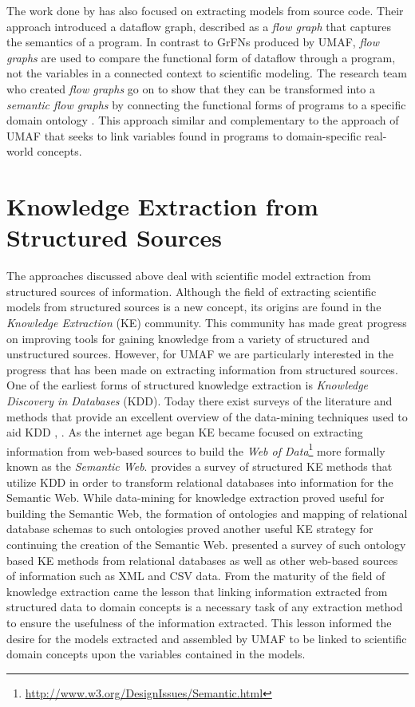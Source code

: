 The work done by \citet{Patterson2017DataflowRO} has also focused on extracting models from source code.
Their approach introduced a dataflow graph, described as a \textit{flow graph} that captures the semantics of a program.
In contrast to GrFNs produced by UMAF, \textit{flow graphs} are used to compare the functional form of dataflow through a program, not the variables in a connected context to scientific modeling.
The research team who created \textit{flow graphs} go on to show that they can be transformed into a \textit{semantic flow graphs} by connecting the functional forms of programs to a specific domain ontology \citep{Patterson2018TeachingMT}.
This approach similar and complementary to the approach of UMAF that seeks to link variables found in programs to domain-specific real-world concepts.

\section{Knowledge Extraction from Structured Sources \label{sec:rwork_knowlegde_extraction}}
The approaches discussed above deal with scientific model extraction from structured sources of information.
Although the field of extracting scientific models from structured sources is a new concept, its origins are found in the \textit{Knowledge Extraction} (KE) community.
This community has made great progress on improving tools for gaining knowledge from a variety of structured and unstructured sources.
However, for UMAF we are particularly interested in the progress that has been made on extracting information from structured sources.
One of the earliest forms of structured knowledge extraction is \textit{Knowledge Discovery in Databases} (KDD).
Today there exist surveys of the literature and methods that provide an excellent overview of the data-mining techniques used to aid KDD \citep{Fayyad1996FromDM}, \citep{Fayyad1997KnowledgeDI}.
As the internet age began KE became focused on extracting information from web-based sources to build the \textit{Web of Data}\footnote{\url{http://www.w3.org/DesignIssues/Semantic.html}} more formally known as the \textit{Semantic Web}.
\citet{Unbehauen2012KnowledgeEF} provides a survey of structured KE methods that utilize KDD in order to transform relational databases into information for the Semantic Web.
While data-mining for knowledge extraction proved useful for building the Semantic Web, the formation of ontologies and mapping of relational database schemas to such ontologies proved another useful KE strategy for continuing the creation of the Semantic Web.
\citet{Wimalasuriya2010OntologybasedIE} presented a survey of such ontology based KE methods from relational databases as well as other web-based sources of information such as XML and CSV data.
From the maturity of the field of knowledge extraction came the lesson that linking information extracted from structured data to domain concepts is a necessary task of any extraction method to ensure the usefulness of the information extracted.
This lesson informed the desire for the models extracted and assembled by UMAF to be linked to scientific domain concepts upon the variables contained in the models.
